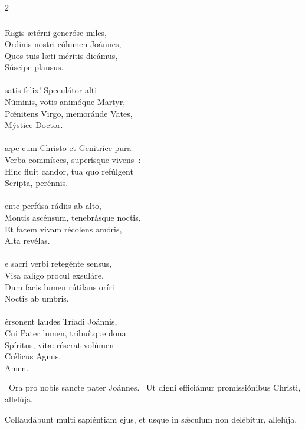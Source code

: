 \documentclass[9pt,twoside]{extarticle}
\begin{document}
\begin{multicols}{2}
\subsubsection*{\center {}}
\lettrine{R}egis ætérni generóse miles,\\
Ordinis nostri cólumen Joánnes,\\
Quos tuis læti méritis dicámus,\\
Súscipe plausus.\\
\\
 satis felix! Speculátor alti\\
Núminis, votis animóque Martyr,\\
Pœ́nitens Virgo, memoránde Vates,\\
Mýstice Doctor.\\
\\
æpe cum Christo et Genitríce pura\\
Verba commísces, superísque vivens~:\\
Hinc fluit candor, tua quo refúlgent\\
Scripta, perénnis.\\
\\
ente perfúsa rádiis ab alto,\\
Montis ascénsum, tenebrásque noctis,\\
Et facem vivam récolens amóris,\\
Alta revélas.\\
\\
e sacri verbi retegénte sensus,\\
Visa calígo procul exsuláre,\\
Dum facis lumen rútilans oríri\\
Noctis ab umbris.\\
\\
érsonent laudes Tríadi Joánnis,\\
Cui Pater lumen, tribuítque dona\\
Spíritus, vitæ réserat volúmen\\
Cœ́licus Agnus.\\
Amen.

\begin{tightlist}{}
\item {}~Ora pro nobis sancte pater Joánnes. ~Ut digni efficiámur promissiónibus Christi, allelúja.
\item {} Collaudábunt multi sapiéntiam ejus, et usque in sǽculum non delébitur, allelúja.
\end{tightlist}


\end{multicols}
\end{document}
